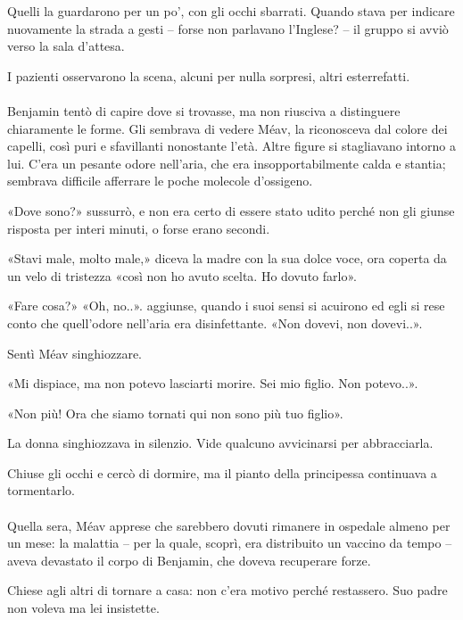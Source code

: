 \documentclass[a4paper,12pt]{book}
\begin{document}
Quelli la guardarono per un po', con gli occhi sbarrati. Quando stava per
indicare nuovamente la strada a gesti -- forse non parlavano l'Inglese? -- il
gruppo si avviò verso la sala d'attesa.

I pazienti osservarono la scena, alcuni per nulla sorpresi, altri esterrefatti.

\paragraph{}
Benjamin tentò di capire dove si trovasse, ma non riusciva a distinguere
chiaramente le forme. Gli sembrava di vedere Méav, la riconosceva dal colore
dei capelli, così puri e sfavillanti nonostante l'età. Altre figure si
stagliavano intorno a lui. C'era un pesante odore nell'aria, che era
insopportabilmente calda e stantia; sembrava difficile afferrare le poche
molecole d'ossigeno.

«Dove sono?» sussurrò, e non era certo di essere stato udito perché non gli
giunse risposta per interi minuti, o forse erano secondi.

«Stavi male, molto male,» diceva la madre con la sua dolce voce, ora coperta
da un velo di tristezza «così non ho avuto scelta. Ho dovuto farlo».

«Fare cosa?» «Oh, no..». aggiunse, quando i suoi sensi si acuirono ed egli
si rese conto che quell'odore nell'aria era disinfettante. «Non dovevi, non
dovevi..».

Sentì Méav singhiozzare.

«Mi dispiace, ma non potevo lasciarti morire. Sei mio figlio. Non potevo..».

«Non più! Ora che siamo tornati qui non sono più tuo figlio».

La donna singhiozzava in silenzio. Vide qualcuno avvicinarsi per abbracciarla.

Chiuse gli occhi e cercò di dormire, ma il pianto della principessa continuava
a tormentarlo.

\paragraph{}
Quella sera, Méav apprese che sarebbero dovuti rimanere in ospedale almeno per
un mese: la malattia -- per la quale, scoprì, era distribuito un vaccino da
tempo -- aveva devastato il corpo di Benjamin, che doveva recuperare forze.

Chiese agli altri di tornare a casa: non c'era motivo perché restassero. Suo
padre non voleva ma lei insistette.
\end{document}

